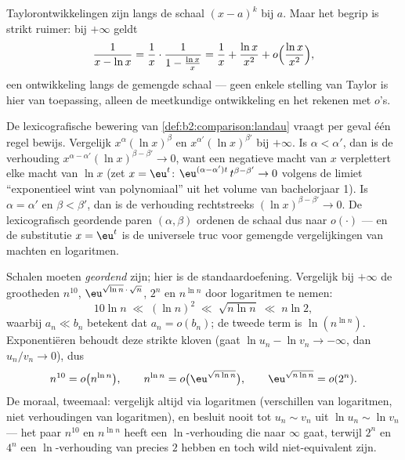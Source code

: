 \begin{example}
Taylorontwikkelingen zijn  langs de
schaal $(x - a)^k$ bij $a$. Maar het begrip is strikt ruimer: bij
$+\infty$ geldt
\[
\frac{1}{x - \ln x}
= \frac1x \cdot \frac{1}{1 - \frac{\ln x}{x}}
= \frac1x + \frac{\ln x}{x^2} + o\Bigl(\frac{\ln x}{x^2}\Bigr),
\]
een ontwikkeling langs de gemengde schaal --- geen enkele
stelling van Taylor is hier van toepassing, alleen de meetkundige
ontwikkeling en het rekenen met $o$'s.
\end{example}

\begin{example}\label{ex:b2:comparison:scaleorder}
De lexicografische bewering van \cref{def:b2:comparison:landau}
vraagt per geval één regel bewijs. Vergelijk
$x^{\alpha}(\ln x)^{\beta}$ en $x^{\alpha'}(\ln x)^{\beta'}$ bij
$+\infty$. Is $\alpha < \alpha'$, dan is de verhouding
$x^{\alpha - \alpha'}(\ln x)^{\beta - \beta'} \to 0$, want een
negatieve macht van $x$ verplettert elke macht van $\ln x$ (zet $x
= \eu^t$: $\eu^{(\alpha - \alpha')t}\,t^{\beta - \beta'} \to 0$
volgens de limiet ``exponentieel wint van polynomiaal'' uit het
volume van bachelorjaar 1). Is $\alpha = \alpha'$ en $\beta <
\beta'$, dan is de verhouding rechtstreeks $(\ln x)^{\beta -
\beta'} \to 0$. De lexicografisch geordende paren $(\alpha,
\beta)$ ordenen de schaal dus naar $o(\cdot)$ --- en de
substitutie $x = \eu^t$ is de universele truc voor gemengde
vergelijkingen van machten en logaritmen.
\end{example}

\begin{example}\label{ex:b2:comparison:ranking}
Schalen moeten \emph{geordend} zijn; hier is de standaardoefening.
Vergelijk bij $+\infty$ de grootheden $n^{10}$,
$\eu^{\sqrt{\ln n}\,\cdot\,\sqrt n}$, $2^n$ en $n^{\ln n}$ door
logaritmen te nemen:
\[
10\ln n
\;\ll\; (\ln n)^2
\;\ll\; \sqrt{n\ln n}
\;\ll\; n\ln 2 ,
\]
waarbij $a_n \ll b_n$ betekent dat $a_n = o(b_n)$; de tweede term
is $\ln(n^{\ln n})$. Exponentiëren behoudt deze strikte kloven
(gaat $\ln u_n - \ln v_n \to -\infty$, dan $u_n/v_n \to 0$), dus
\[
n^{10} = o\bigl(n^{\ln n}\bigr),
\qquad
n^{\ln n} = o\bigl(\eu^{\sqrt{n\ln n}}\bigr),
\qquad
\eu^{\sqrt{n\ln n}} = o(2^n) .
\]
De moraal, tweemaal: vergelijk altijd via logaritmen (verschillen
van logaritmen, niet verhoudingen van logaritmen), en besluit
nooit tot $u_n \sim v_n$ uit $\ln u_n \sim \ln v_n$ --- het paar
$n^{10}$ en $n^{\ln n}$ heeft een $\ln$-verhouding die naar
$\infty$ gaat, terwijl $2^n$ en $4^n$ een $\ln$-verhouding van
precies $2$ hebben en toch wild niet-equivalent zijn.
\end{example}

